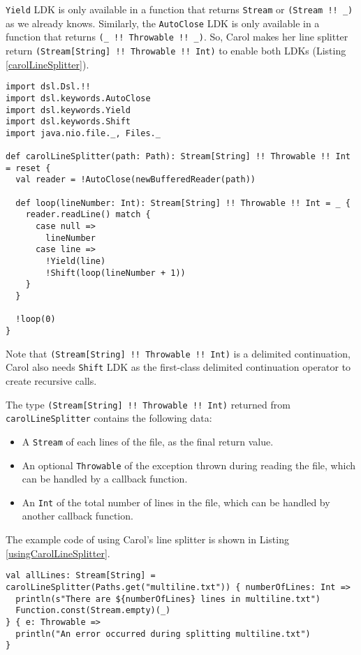 \lstinline{Yield} LDK is only available in a function that returns \lstinline{Stream} or \lstinline{(Stream !! _)} as we already knows. Similarly, the \lstinline{AutoClose} LDK is only available in a function that returns \lstinline{(_ !! Throwable !! _)}. So, Carol makes her line splitter return \lstinline{(Stream[String] !! Throwable !! Int)} to enable both LDKs (Listing \ref{carolLineSplitter}).

\begin{lstlisting}[caption={Carol's line splitter},label={carolLineSplitter}]
import dsl.Dsl.!!
import dsl.keywords.AutoClose
import dsl.keywords.Yield
import dsl.keywords.Shift
import java.nio.file._, Files._

def carolLineSplitter(path: Path): Stream[String] !! Throwable !! Int = reset {
  val reader = !AutoClose(newBufferedReader(path))

  def loop(lineNumber: Int): Stream[String] !! Throwable !! Int = _ {
    reader.readLine() match {
      case null =>
        lineNumber
      case line =>
        !Yield(line)
        !Shift(loop(lineNumber + 1))
    }
  }

  !loop(0)
}
\end{lstlisting}

Note that \lstinline{(Stream[String] !! Throwable !! Int)} is a delimited continuation, Carol also needs \lstinline{Shift} LDK as the first-class delimited continuation operator\cite{danvy1990abstracting,asai2009typing} to create recursive calls.

The type \lstinline{(Stream[String] !! Throwable !! Int)} returned from \lstinline{carolLineSplitter} contains the following data:

\begin{itemize}
  \item A \lstinline{Stream} of each lines of the file, as the final return value.
  \item An optional \lstinline{Throwable} of the exception thrown during reading the file, which can be handled by a callback function.
  \item An \lstinline{Int} of the total number of lines in the file, which can be handled by another callback function.
\end{itemize}

The example code of using Carol's line splitter is shown in Listing \ref{usingCarolLineSplitter}.

\begin{lstlisting}[caption={Using Carol's line splitter},label={usingCarolLineSplitter}]
val allLines: Stream[String] = carolLineSplitter(Paths.get("multiline.txt")) { numberOfLines: Int =>
  println(s"There are ${numberOfLines} lines in multiline.txt")
  Function.const(Stream.empty)(_)
} { e: Throwable =>
  println("An error occurred during splitting multiline.txt")
}
\end{lstlisting}

